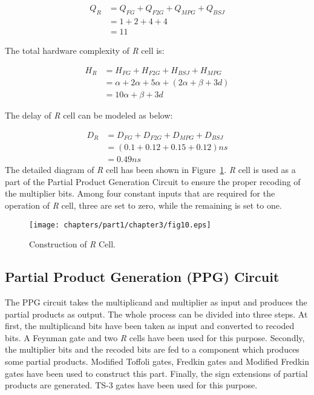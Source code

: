 \begin{align*}
Q_R &= Q_{FG} + Q_{F2G} + Q_{MPG} + Q_{BSJ}\\
&= 1 + 2 + 4 + 4\\
&= 11
\end{align*}


The total hardware complexity of \textit{R} cell is:

\begin{align*}
H_{R} &= H_{FG} + H_{F2G} + H_{BSJ} + H_{MPG}\\
&= \alpha + 2 \alpha + 5\alpha + (2\alpha + \beta+3d) \\
&= 10\alpha + \beta + 3d
\end{align*}




The delay of \textit{R} cell can be modeled as below:

\begin{align*}
D_{R}&=D_{FG} + D_{F2G} + D_{MPG} + D_{BSJ}\\
&= (0.1 + 0.12 + 0.15 + 0.12) ns\\
&= 0.49 ns
\end{align*}
The detailed diagram of \textit{R} cell has been shown in Figure~\ref{fig:p1_c3_fig10}. \textit{R} cell is used as a part of the Partial Product Generation Circuit to ensure the proper recoding of the multiplier bits. Among four constant inputs that are required for the operation of \textit{R} cell, three are set to zero, while the remaining is set to one. 



\begin{figure}[!tbh]
	\centering
	\texttt{[image: chapters/part1/chapter3/fig10.eps]}
	\caption{Construction of \textit{R} Cell.}
	\label{fig:p1_c3_fig10}
\end{figure}

\subsection{Partial Product Generation (PPG) Circuit}

The PPG circuit takes the multiplicand and multiplier as input and produces the partial products as output. The whole process can be divided into three steps. At first, the multiplicand bits have been taken as input and converted to recoded bits. A Feynman gate and two \textit{R} cells have been used for this purpose. Secondly, the multiplier bits and the recoded bits are fed to a component which produces some partial products. Modified Toffoli gates, Fredkin gates and Modified Fredkin gates have been used to construct this part. Finally, the sign extensions of partial products are generated. TS-3 gates have been used for this purpose.


